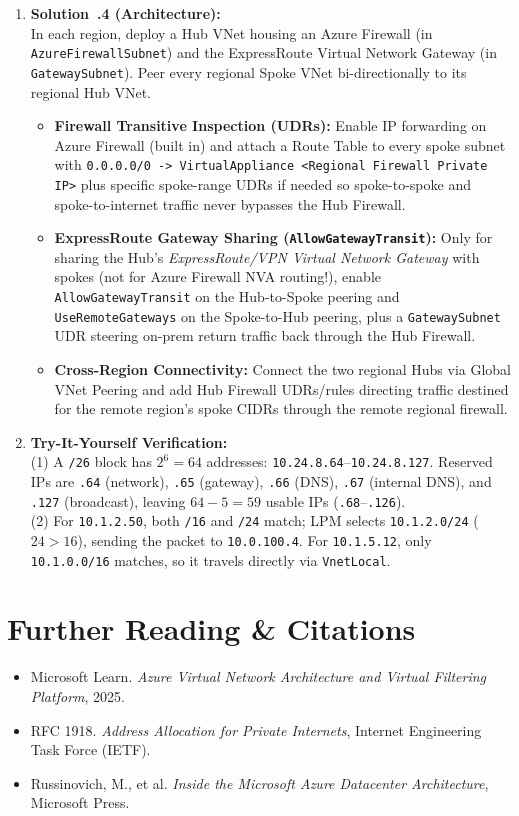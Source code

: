 \begin{enumerate}[leftmargin=18pt]
  \item \textbf{Solution~\thechapter.4 (Architecture):}\\
  In each region, deploy a Hub VNet housing an Azure Firewall (in \texttt{AzureFirewallSubnet}) and the ExpressRoute Virtual Network Gateway (in \texttt{GatewaySubnet}). Peer every regional Spoke VNet bi-directionally to its regional Hub VNet.
  \begin{itemize}[leftmargin=12pt]
    \item \textbf{Firewall Transitive Inspection (UDRs):} Enable IP forwarding on Azure Firewall (built in) and attach a Route Table to every spoke subnet with \texttt{0.0.0.0/0 -> VirtualAppliance <Regional Firewall Private IP>} plus specific spoke-range UDRs if needed so spoke-to-spoke and spoke-to-internet traffic never bypasses the Hub Firewall.
    \item \textbf{ExpressRoute Gateway Sharing (\texttt{AllowGatewayTransit}):} Only for sharing the Hub's \emph{ExpressRoute/VPN Virtual Network Gateway} with spokes (not for Azure Firewall NVA routing!), enable \texttt{AllowGatewayTransit} on the Hub-to-Spoke peering and \texttt{UseRemoteGateways} on the Spoke-to-Hub peering, plus a \texttt{GatewaySubnet} UDR steering on-prem return traffic back through the Hub Firewall.
    \item \textbf{Cross-Region Connectivity:} Connect the two regional Hubs via Global VNet Peering and add Hub Firewall UDRs/rules directing traffic destined for the remote region's spoke CIDRs through the remote regional firewall.
  \end{itemize}

  \item \textbf{Try-It-Yourself Verification:}\\
  (1) A \texttt{/26} block has $2^6 = 64$ addresses: \texttt{10.24.8.64}--\texttt{10.24.8.127}. Reserved IPs are \texttt{.64} (network), \texttt{.65} (gateway), \texttt{.66} (DNS), \texttt{.67} (internal DNS), and \texttt{.127} (broadcast), leaving $64 - 5 = 59$ usable IPs (\texttt{.68}--\texttt{.126}).\\
  (2) For \texttt{10.1.2.50}, both \texttt{/16} and \texttt{/24} match; LPM selects \texttt{10.1.2.0/24} ($24 > 16$), sending the packet to \texttt{10.0.100.4}. For \texttt{10.1.5.12}, only \texttt{10.1.0.0/16} matches, so it travels directly via \texttt{VnetLocal}.
\end{enumerate}

\section{Further Reading \protect\& Citations}
\begin{itemize}[leftmargin=15pt]
  \item Microsoft Learn. \emph{Azure Virtual Network Architecture and Virtual Filtering Platform}, 2025.
  \item RFC 1918. \emph{Address Allocation for Private Internets}, Internet Engineering Task Force (IETF).
  \item Russinovich, M., et al. \emph{Inside the Microsoft Azure Datacenter Architecture}, Microsoft Press.
\end{itemize}
